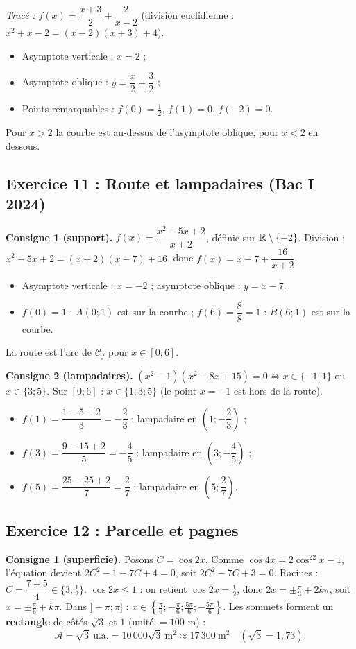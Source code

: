 \emph{Trac\'e :} $f(x)=\dfrac{x+3}{2}+\dfrac{2}{x-2}$ (division euclidienne : $x^2+x-2=(x-2)(x+3)+4$).
\begin{itemize}
  \item Asymptote verticale : $x=2$ ;
  \item Asymptote oblique : $y=\dfrac{x}{2}+\dfrac32$ ;
  \item Points remarquables : $f(0)=\frac12$, $f(1)=0$, $f(-2)=0$.
\end{itemize}
Pour $x>2$ la courbe est au-dessus de l'asymptote oblique, pour $x<2$ en dessous.

\subsection{Exercice 11 : Route et lampadaires (Bac I 2024)}

\textbf{Consigne 1 (support).} $f(x)=\dfrac{x^2-5x+2}{x+2}$, d\'efinie sur $\mathbb{R}\setminus\{-2\}$.
Division : $x^2-5x+2=(x+2)(x-7)+16$, donc $f(x)=x-7+\dfrac{16}{x+2}$.
\begin{itemize}
  \item Asymptote verticale : $x=-2$ ; asymptote oblique : $y=x-7$.
  \item $f(0)=1$ : $A(0;1)$ est sur la courbe ; $f(6)=\dfrac{8}{8}=1$ : $B(6;1)$ est sur la courbe.
\end{itemize}
La route est l'arc de $\mathcal C_f$ pour $x\in[0;6]$.

\medskip\noindent\textbf{Consigne 2 (lampadaires).} $(x^2-1)(x^2-8x+15)=0\iff x\in\{-1;1\}$ ou $x\in\{3;5\}$.
Sur $[0;6]$ : $x\in\{1;3;5\}$ (le point $x=-1$ est hors de la route).
\begin{itemize}
  \item $f(1)=\dfrac{1-5+2}{3}=-\dfrac23$ : lampadaire en $\left(1;-\dfrac23\right)$ ;
  \item $f(3)=\dfrac{9-15+2}{5}=-\dfrac45$ : lampadaire en $\left(3;-\dfrac45\right)$ ;
  \item $f(5)=\dfrac{25-25+2}{7}=\dfrac27$ : lampadaire en $\left(5;\dfrac27\right)$.
\end{itemize}

\subsection{Exercice 12 : Parcelle et pagnes}

\textbf{Consigne 1 (superficie).} Posons $C=\cos2x$. Comme $\cos4x=2\cos^22x-1$, l'\'equation devient
$2C^2-1-7C+4=0$, soit $2C^2-7C+3=0$. Racines : $C=\dfrac{7\pm5}{4}\in\{3;\tfrac12\}$.
$\cos2x\le1$ : on retient $\cos2x=\frac12$, donc $2x=\pm\frac{\pi}{3}+2k\pi$, soit $x=\pm\frac{\pi}{6}+k\pi$.
Dans $]-\pi;\pi]$ : $x\in\left\{\frac{\pi}{6};-\frac{\pi}{6};\frac{5\pi}{6};-\frac{5\pi}{6}\right\}$.
Les sommets forment un \textbf{rectangle} de c\^ot\'es $\sqrt3$ et $1$ (unit\'e $=100$ m) :
\[
\mathcal A=\sqrt3\ \text{u.a.}=10\,000\sqrt3\ \text{m}^2\approx 17\,300\ \text{m}^2\quad(\sqrt3=1{,}73).
\]

